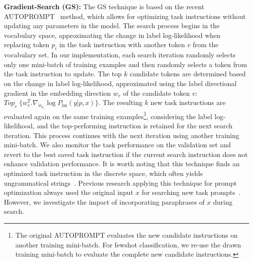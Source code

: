 \documentclass[11pt]{article}
\begin{document}
\textbf{Gradient-Search (GS):}
The GS technique is based on the recent AUTOPROMPT~\cite{shin-etal-2020-autoprompt} method, which allows for optimizing task instructions without updating any parameters in the model. The search process begins in the vocabulary space, approximating the change in label log-likelihood when replacing token $p_{i}$ in the task instruction with another token $v$ from the vocabulary set. In our implementation, each search iteration randomly selects only one mini-batch of training examples and then randomly selects a token from the task instruction to update. The top $k$ candidate tokens are determined based on the change in label log-likelihood, approximated using the label directional gradient in the embedding direction $w_v$ of the candidate token $v$: $Top_v \; \{w^{T}_{v} . \nabla_{w_{p_i}} \log P_{\text{lm}}(y|p,x)\}$. The resulting $k$ new task instructions are evaluated again on the same training examples\footnote{The original AUTOPROMPT evaluates the new candidate instructions on another training mini-batch. For fewshot classification, we re-use the drawn training mini-batch to evaluate the complete new candidate instructions.}, considering the label log-likelihood, and the top-performing instruction is retained for the next search iteration. This process continues with the next iteration using another training mini-batch. We also monitor the task performance on the validation set and revert to the best saved task instruction if the current search instruction does not enhance validation performance. It is worth noting that this technique finds an optimized task instruction in the discrete space, which often yields ungrammatical strings~\cite{shin-etal-2020-autoprompt}. Previous research applying this technique for prompt optimization always used the original input $x$ for searching new task prompts~\cite{shin-etal-2020-autoprompt, deng-etal-2022-rlprompt}. However, we investigate the impact of incorporating paraphrases of $x$ during search.
\end{document}
